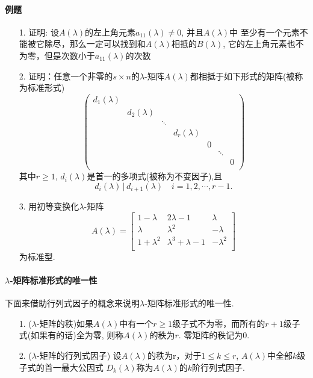 \paragraph{例题}
\begin{itemize}
  \item[1.] 证明: 设$A(\lambda)$的左上角元素$a_{11}(\lambda) \ne 0$, 并且$A(\lambda)$中
至少有一个元素不能被它除尽，那么一定可以找到和$A(\lambda)$相抵的$B(\lambda)$,
它的左上角元素也不为零，但是次数小于$a_{11}(\lambda)$的次数
  \vspace{3cm}
  
  \item[2.] 证明：任意一个非零的$s\times n$的$\lambda$-矩阵$A(\lambda)$都相抵于如下形式的矩阵(被称为标准形式)
\begin{equation}
\nonumber
\begin{pmatrix}
  d_1(\lambda)&&&&&&\\
  &d_2(\lambda)&&&&&\\
  &&\ddots&&&&\\
  &&&d_r(\lambda)&&&\\
  &&&&0&&\\
  &&&&&\ddots&\\
  &&&&&&0\\
\end{pmatrix}
\end{equation}
其中$r\ge 1$, $d_i(\lambda)$是首一的多项式(被称为不变因子),且
$$d_i(\lambda)\,|\,d_{i+1}(\lambda)\quad i=1,2,\cdots, r-1.$$
\vspace{4cm}

\item[3.]用初等变换化$\lambda$-矩阵
\begin{equation}
\nonumber
A(\lambda) =
\begin{bmatrix}
1-\lambda& 2\lambda-1& \lambda\\
\lambda&   \lambda^2&  -\lambda\\
1+\lambda^2& \lambda^3+\lambda-1& -\lambda^2\\
\end{bmatrix}
\end{equation}
为标准型.
\vspace{3cm}
\end{itemize}

\paragraph{$\lambda$-矩阵标准形式的唯一性}
下面来借助行列式因子的概念来说明$\lambda$-矩阵标准形式的唯一性.
\begin{itemize}
  \item[1.] ($\lambda$-矩阵的秩)如果$A(\lambda)$中有一个$r\ge 1$级子式不为零，而所有的$r+1$级子式(如果有的话)全为零,
则称$A(\lambda)$的秩为$r$. 零矩阵的秩记为0.
  \item[2.] ($\lambda$-矩阵的行列式因子) 设$A(\lambda)$的秩为r，对于$1 \le k \le r$, $A(\lambda)$中全部$k$级子式的首一最大公因式
$D_{k}(\lambda)$称为$A(\lambda)$的$k$阶行列式因子.
\end{itemize}

